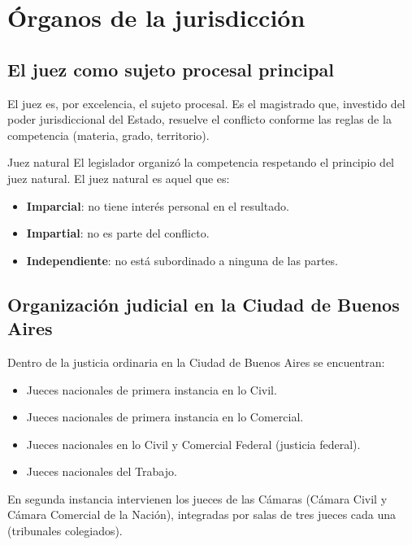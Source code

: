 \documentclass[12pt,oneside]{book}
\begin{document}
\chapter{Órganos de la jurisdicción}

\section{El juez como sujeto procesal principal}

El juez es, por excelencia, el sujeto procesal. Es el magistrado que, investido del poder jurisdiccional del Estado, resuelve el conflicto conforme las reglas de la competencia (materia, grado, territorio).

\begin{definition}{Juez natural}
El legislador organizó la competencia respetando el principio del juez natural. El juez natural es aquel que es:
\begin{itemize}
    \item \textbf{Imparcial}: no tiene interés personal en el resultado.
    \item \textbf{Impartial}: no es parte del conflicto.
    \item \textbf{Independiente}: no está subordinado a ninguna de las partes.
\end{itemize}
\end{definition}

\section{Organización judicial en la Ciudad de Buenos Aires}

Dentro de la justicia ordinaria en la Ciudad de Buenos Aires se encuentran:

\begin{itemize}
    \item Jueces nacionales de primera instancia en lo Civil.
    \item Jueces nacionales de primera instancia en lo Comercial.
    \item Jueces nacionales en lo Civil y Comercial Federal (justicia federal).
    \item Jueces nacionales del Trabajo.
\end{itemize}

En segunda instancia intervienen los jueces de las Cámaras (Cámara Civil y Cámara Comercial de la Nación), integradas por salas de tres jueces cada una (tribunales colegiados).
\end{document}

